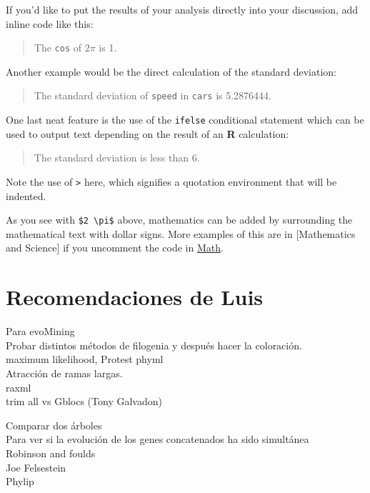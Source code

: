 \documentclass[12pt,twoside]{reedthesis}
\begin{document}
  If you'd like to put the results of your analysis directly into your
  discussion, add inline code like this:
  
  \begin{quote}
  The \texttt{cos} of \(2 \pi\) is 1.
  \end{quote}
  
  Another example would be the direct calculation of the standard
  deviation:
  
  \begin{quote}
  The standard deviation of \texttt{speed} in \texttt{cars} is 5.2876444.
  \end{quote}
  
  One last neat feature is the use of the \texttt{ifelse} conditional
  statement which can be used to output text depending on the result of an
  \textbf{R} calculation:
  
  \begin{quote}
  The standard deviation is less than 6.
  \end{quote}
  
  Note the use of \texttt{\textgreater{}} here, which signifies a
  quotation environment that will be indented.
  
  As you see with \texttt{\$2\ \textbackslash{}pi\$} above, mathematics
  can be added by surrounding the mathematical text with dollar signs.
  More examples of this are in {[}Mathematics and Science{]} if you
  uncomment the code in \protect\hyperlink{math}{Math}.
  
  \section{Recomendaciones de Luis}\label{recomendaciones-de-luis}
  
  Para evoMining\\
  Probar distintos métodos de filogenia y después hacer la coloración.\\
  maximum likelihood, Protest phyml\\
  Atracción de ramas largas.\\
  raxml\\
  trim all vs Gblocs (Tony Galvadon)
  
  Comparar dos árboles\\
  Para ver si la evolución de los genes concatenados ha sido simultánea\\
  Robinson and foulds\\
  Joe Felsestein\\
  Phylip
  
\end{document}
